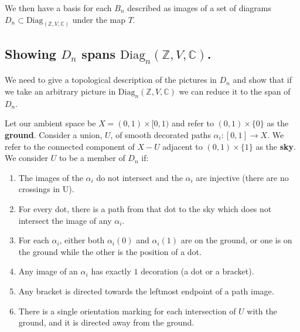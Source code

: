 \documentclass[11pt]{article} %
\begin{document}
 We then have a basis for each $B_n$ described as images of a set of diagrams $D_n \subset \text{Diag}_{(\mathbb{Z},V,\mathbb{C})}$ under the map $T$.

\subsection{Showing $D_n$ spans $\text{Diag}_n(\mathbb{Z},V,\mathbb{C})$.}

We need to give a topological description of the pictures in $D_n$ and show that if we take an arbitrary picture in $\text{Diag}_n(\mathbb{Z},V,\mathbb{C})$ we can reduce it to the span of $D_n$.

\begin{mydef} Let our ambient space be $X=(0,1) \times [0,1)$ and refer to $(0,1) \times \{0\}$ as the \textbf{ground}. Consider a union, $U$, of smooth decorated paths $\alpha_i:[0,1] \rightarrow X$. We refer to the connected component of $X-U$ adjacent to $(0,1) \times \{1\}$ as the \textbf{sky}. We consider $U$ to be a member of $D_n$ if:
\begin{enumerate}
\item The images of the $\alpha_i$ do not intersect and the $\alpha_i$ are injective (there are no crossings in U).
\item For every dot, there is a path from that dot to the sky which does not intersect the image of any $\alpha_i$.
\item For each $\alpha_i$, either both $\alpha_i(0)$ and $\alpha_i(1)$ are on the ground, or one is on the ground while the other is the position of a dot.
\item Any image of an $\alpha_i$ has exactly $1$ decoration (a dot or a bracket).
\item Any bracket is directed towards the leftmost endpoint of a path image.

\item There is a single orientation marking for each intersection of $U$ with the ground, and it is directed away from the ground.
\end{enumerate}
\end{mydef}
\end{document}
